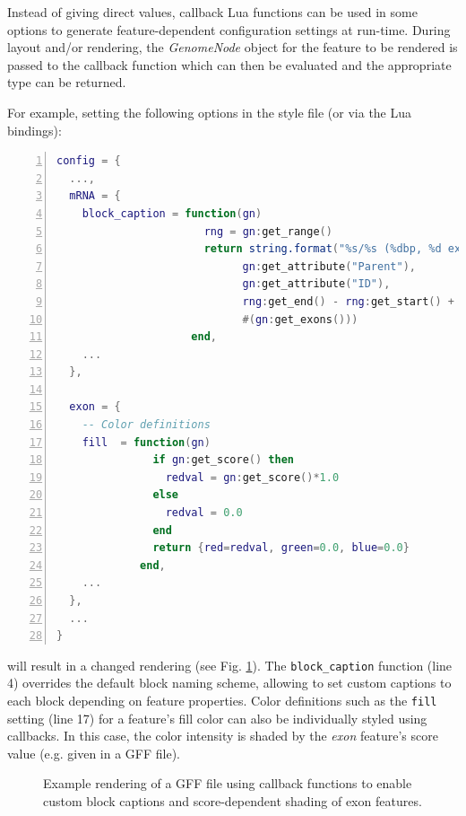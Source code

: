 \documentclass[a4paper]{scrreprt}
\begin{document}
\par Instead of giving direct values, callback Lua functions can be used in some options to generate feature-dependent configuration settings at run-time. During layout and/or rendering, the \emph{GenomeNode} object for the feature to be rendered is passed to the callback function which can then be evaluated and the appropriate type can be returned.
\par For example, setting the following options in the style file (or via the Lua bindings):

\begin{lstlisting}[language=Lua, showstringspaces=false,numbers=left,frame=single]
config = {
  ...,
  mRNA = {
    block_caption = function(gn)
                       rng = gn:get_range()
                       return string.format("%s/%s (%dbp, %d exons)",
                             gn:get_attribute("Parent"),
                             gn:get_attribute("ID"),
                             rng:get_end() - rng:get_start() + 1,
                             #(gn:get_exons()))
                     end,
    ...
  },

  exon = {
    -- Color definitions
    fill  = function(gn)
               if gn:get_score() then
                 redval = gn:get_score()*1.0
               else
                 redval = 0.0
               end
               return {red=redval, green=0.0, blue=0.0}
             end,
    ...
  },
  ...
}
\end{lstlisting}
 will result in a changed rendering (see Fig. \ref{callbacks}). The \texttt{block\_caption} function (line 4) overrides the default block naming scheme, allowing to set custom captions to each block depending on feature properties. Color definitions such as the \texttt{fill} setting (line 17) for a feature's fill color can also be individually styled using callbacks. In this case, the color intensity is shaded by the \emph{exon} feature's score value (e.g. given in a GFF file).

\begin{figure}
\caption{Example rendering of a GFF file using callback functions to enable custom block captions and score-dependent shading of exon features.}
\label{callbacks}
\end{figure}
\end{document}
